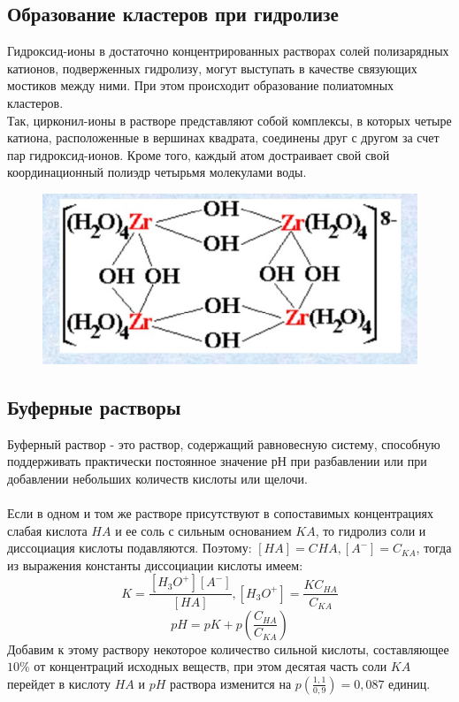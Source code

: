 \documentclass[14pt,a4paper]{scrartcl}
\begin{document}
\subsection*{Образование кластеров при гидролизе}
Гидроксид-ионы в достаточно концентрированных растворах солей полизарядных катионов, подверженных гидролизу, могут выступать в качестве связующих мостиков между ними. При этом происходит образование полиатомных кластеров. \\
Так, цирконил-ионы в растворе представляют собой комплексы, в которых четыре катиона, расположенные в вершинах квадрата, соединены друг с другом за счет пар гидроксид-ионов. Кроме того, каждый атом достраивает свой свой координационный полиэдр четырьмя молекулами воды.
\begin{figure}[H]
	\centering
	\includegraphics[scale=1]{cluster}
	\caption{}
	\label{}
\end{figure}
\subsection*{Буферные растворы}
Буферный раствор - это раствор, содержащий равновесную систему, способную поддерживать практически постоянное значение рН при разбавлении или при добавлении небольших количеств кислоты или щелочи. \\\\
Если в одном и том же растворе присутствуют в сопоставимых концентрациях слабая кислота $HA$ и ее соль с сильным основанием $KA$, то гидролиз соли и диссоциация кислоты подавляются. Поэтому:
$ [HA] = C_{}HA, [A^-] = C_{KA} $, тогда из выражения константы диссоциации кислоты имеем:
$$ K = \dfrac{[H_3O^+][A^-]}{[HA]}, [H_3O^+] = \dfrac{KC_{HA}}{C_{KA}} $$
$$ pH = pK + p \left( \dfrac{C_{HA}}{C_{KA}} \right) $$
Добавим к этому раствору некоторое количество сильной кислоты, составляющее $10\%$ от концентраций исходных веществ, при этом десятая часть соли $KA$ перейдет в кислоту $ HA$ и $pH$ раствора изменится на $p(\frac{1,1}{0,9}) = 0,087$ единиц.
\end{document}

